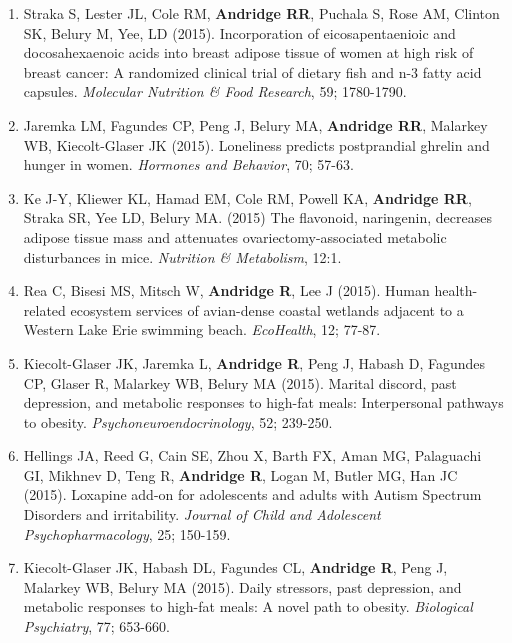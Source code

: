 \documentclass[
  english,
  letterpaper,
  DIV=11,
  numbers=noendperiod]{scrartcl}
\begin{document}
\begin{enumerate}
\item
  Straka S, Lester JL, Cole RM, \textbf{Andridge RR}, Puchala S, Rose
  AM, Clinton SK, Belury M, Yee, LD (2015). Incorporation of
  eicosapentaenioic and docosahexaenoic acids into breast adipose tissue
  of women at high risk of breast cancer: A randomized clinical trial of
  dietary fish and n-3 fatty acid capsules. \emph{Molecular Nutrition \&
  Food Research}, 59; 1780-1790.
\item
  Jaremka LM, Fagundes CP, Peng J, Belury MA, \textbf{Andridge RR},
  Malarkey WB, Kiecolt-Glaser JK (2015). Loneliness predicts
  postprandial ghrelin and hunger in women. \emph{Hormones and
  Behavior}, 70; 57-63.
\item
  Ke J-Y, Kliewer KL, Hamad EM, Cole RM, Powell KA, \textbf{Andridge
  RR}, Straka SR, Yee LD, Belury MA. (2015) The flavonoid, naringenin,
  decreases adipose tissue mass and attenuates ovariectomy-associated
  metabolic disturbances in mice. \emph{Nutrition \& Metabolism}, 12:1.
\item
  Rea C, Bisesi MS, Mitsch W, \textbf{Andridge R}, Lee J (2015). Human
  health-related ecosystem services of avian-dense coastal wetlands
  adjacent to a Western Lake Erie swimming beach. \emph{EcoHealth}, 12;
  77-87.
\item
  Kiecolt-Glaser JK, Jaremka L, \textbf{Andridge R}, Peng J, Habash D,
  Fagundes CP, Glaser R, Malarkey WB, Belury MA (2015). Marital discord,
  past depression, and metabolic responses to high-fat meals:
  Interpersonal pathways to obesity. \emph{Psychoneuroendocrinology},
  52; 239-250.
\item
  Hellings JA, Reed G, Cain SE, Zhou X, Barth FX, Aman MG, Palaguachi
  GI, Mikhnev D, Teng R, \textbf{Andridge R}, Logan M, Butler MG, Han JC
  (2015). Loxapine add-on for adolescents and adults with Autism
  Spectrum Disorders and irritability. \emph{Journal of Child and
  Adolescent Psychopharmacology}, 25; 150-159.
\item
  Kiecolt-Glaser JK, Habash DL, Fagundes CL, \textbf{Andridge R}, Peng
  J, Malarkey WB, Belury MA (2015). Daily stressors, past depression,
  and metabolic responses to high-fat meals: A novel path to obesity.
  \emph{Biological Psychiatry}, 77; 653-660.


\end{enumerate}
\end{document}
